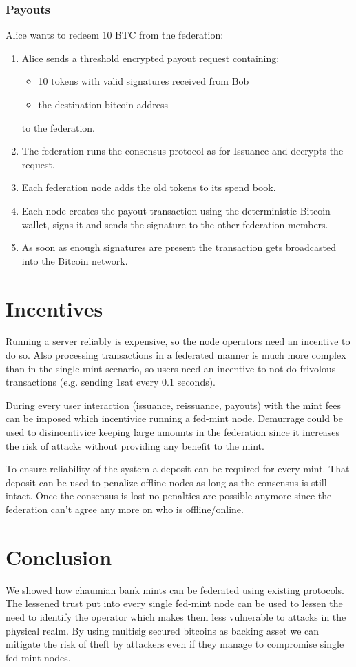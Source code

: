 \documentclass[10pt,a4paper,twocolumn]{article}
\begin{document}
\subsubsection{Payouts}
Alice wants to redeem 10 BTC from the federation:
\begin{enumerate}
	\item Alice sends a threshold encrypted payout request containing:
	\begin{itemize}
		\item 10 tokens with valid signatures received from Bob
		\item the destination bitcoin address
	\end{itemize}
	to the federation.
	\item The federation runs the consensus protocol as for Issuance and decrypts the request.
	\item Each federation node adds the old tokens to its spend book.
	\item Each node creates the payout transaction using the deterministic Bitcoin wallet, signs it and sends the signature to the other federation members.
	\item As soon as enough signatures are present the transaction gets broadcasted into the Bitcoin network.
\end{enumerate}

\section{Incentives}
Running a server reliably is expensive, so the node operators need an incentive to do so. Also processing transactions in a federated manner is much more complex than in the single mint scenario, so users need an incentive to not do frivolous transactions (e.g. sending 1sat every 0.1 seconds).

During every user interaction (issuance, reissuance, payouts) with the mint fees can be imposed which incentivice running a fed-mint node. Demurrage could be used to disincentivice keeping large amounts in the federation since it increases the risk of attacks without providing any benefit to the mint.

To ensure reliability of the system a deposit can be required for every mint. That deposit can be used to penalize offline nodes as long as the consensus is still intact. Once the consensus is lost no penalties are possible anymore since the federation can't agree any more on who is offline/online.

\section{Conclusion}
We showed how chaumian bank mints can be federated using existing protocols.
The lessened trust put into every single fed-mint node can be used to lessen the need to identify the operator which makes them less vulnerable to attacks in the physical realm.
By using multisig secured bitcoins as backing asset we can mitigate the risk of theft by attackers even if they manage to compromise single fed-mint nodes.

\printbibliography
\end{document}
